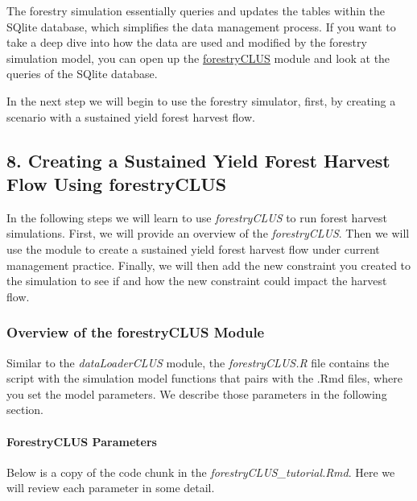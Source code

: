 \documentclass[
]{article}
\begin{document}
The forestry simulation essentially queries and updates the tables
within the SQlite database, which simplifies the data management
process. If you want to take a deep dive into how the data are used and
modified by the forestry simulation model, you can open up the
\href{https://github.com/bcgov/clus/blob/main/R/SpaDES-modules/forestryCLUS/forestryCLUS.R}{forestryCLUS}
module and look at the queries of the SQlite database.

In the next step we will begin to use the forestry simulator, first, by
creating a scenario with a sustained yield forest harvest flow.

\hypertarget{creating-a-sustained-yield-forest-harvest-flow-using-forestryclus}{%
\subsection{8. Creating a Sustained Yield Forest Harvest Flow Using
forestryCLUS}\label{creating-a-sustained-yield-forest-harvest-flow-using-forestryclus}}

In the following steps we will learn to use \emph{forestryCLUS} to run
forest harvest simulations. First, we will provide an overview of the
\emph{forestryCLUS}. Then we will use the module to create a sustained
yield forest harvest flow under current management practice. Finally, we
will then add the new constraint you created to the simulation to see if
and how the new constraint could impact the harvest flow.

\hypertarget{overview-of-the-forestryclus-module}{%
\subsubsection{Overview of the forestryCLUS
Module}\label{overview-of-the-forestryclus-module}}

Similar to the \emph{dataLoaderCLUS} module, the \emph{forestryCLUS.R}
file contains the script with the simulation model functions that pairs
with the .Rmd files, where you set the model parameters. We describe
those parameters in the following section.

\hypertarget{forestryclus-parameters}{%
\paragraph{ForestryCLUS Parameters}\label{forestryclus-parameters}}

Below is a copy of the code chunk in the
\emph{forestryCLUS\_tutorial.Rmd}. Here we will review each parameter in
some detail.
\end{document}
